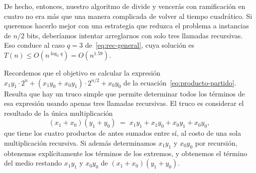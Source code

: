\documentclass[12pt, spanish, oneside, openany]{book}
\theoremstyle{uprightplain}
\theoremstyle{definition}
\theoremstyle{remark}
\theoremstyle{definition}
\begin{document}
De hecho, entonces, nuestro algoritmo de divide y vencerás con ramificación en cuatro no era más que una manera complicada de volver al tiempo cuadrático. Si queremos hacerlo mejor con una estrategia que reduzca el problema a instancias de $n/2$ bits, deberíamos intentar arreglarnos con solo tres llamadas recursivas. Eso conduce al caso $q=3$ de~\eqref{eq:rec-general}, cuya solución es $T(n)\le O(n^{\log_2 q})=O(n^{1.59})$.

Recordemos que el objetivo es calcular la expresión $x_1y_1\cdot 2^n+(x_1y_0+x_0y_1)\cdot 2^{n/2}+x_0y_0$ de la ecuación~\eqref{eq:producto-partido}. Resulta que hay un truco simple que permite determinar todos los términos de esa expresión usando apenas tres llamadas recursivas. El truco es considerar el resultado de la única multiplicación
\[
(x_1+x_0)(y_1+y_0) \;=\; x_1y_1 + x_1y_0 + x_0y_1 + x_0y_0 ,
\]
que tiene los cuatro productos de antes sumados entre sí, al costo de una sola multiplicación recursiva. Si además determinamos $x_1y_1$ y $x_0y_0$ por recursión, obtenemos explícitamente los términos de los extremos, y obtenemos el término del medio restando $x_1y_1$ y $x_0y_0$ de $(x_1+x_0)(y_1+y_0)$.
\end{document}
